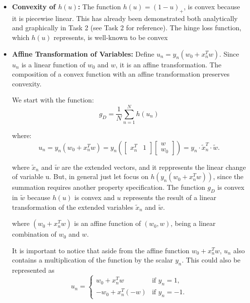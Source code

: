 \documentclass[a4paper,12pt]{report}
\begin{document}
\begin{itemize}
 \item \textbf{Convexity of \( h(u) \):}  
    The function \( h(u) = (1 - u)_+ \), is convex because it is piecewise linear. This has already been demonstrated both analytically and graphically in Task 2 (see Task 2 for reference). The hinge loss function, which \( h(u) \) represents, is well-known to be convex
    
    \item \textbf{Affine Transformation of Variables:}  
    Define \( u_n = y_n(w_0 + x_n^T w) \). Since \( u_n \) is a linear function of \( w_0 \) and \( w \), it is an affine transformation. The composition of a convex function with an affine transformation preserves convexity.
    
    We start with the function:
\begin{equation}
    g_D = \frac{1}{N} \sum_{n=1}^{N} h(u_n)
\end{equation}


where:
\begin{equation}
u_n = y_n(w_0 + x_n^T w) = y_n \left( \begin{bmatrix} x_n^T & 1 \end{bmatrix} \begin{bmatrix} w \\ w_0 \end{bmatrix} \right) =  y_n \cdot \tilde{x}_n^T \cdot \tilde{w} .
\end{equation}

where \( \tilde{x}_n \) and \( \tilde{w} \) are the extended vectors, and it reppresents the linear change of variable u.
But, in general just let focus on  \( h(y_n(w_0 + x_n^T w)) \), since the summation requires another property specification.
The function \( g_D \) is convex in \( \tilde{w} \) because \( h(u) \) is convex and \( u \) represents the result of a linear transformation of the extended variables \( \tilde{x}_n \) and \( \tilde{w} \). 

where \( (w_0 + x_n^T w) \) is an affine function of \( (w_0, w) \), being a linear combination of \( w_0 \) and \( w \).

It is important to notice that aside from the affine function $w_0 + x_n^T w$, $u_n$ also contains a multiplication of the function by the scalar $y_n$. This could also be represented as
\begin{equation} \label{eq:un_definition}
u_n = \begin{cases}
w_0 + x_n^T w & \text{if } y_n = 1, \\
-w_0 + x_n^T (-w) & \text{if } y_n = -1.
\end{cases}
\end{equation}


\end{itemize}
\end{document}
